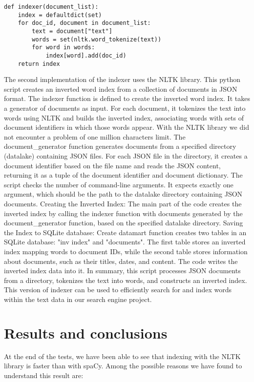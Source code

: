\documentclass{article}
\begin{document}
\begin{verbatim}
def indexer(document_list):
	index = defaultdict(set)
	for doc_id, document in document_list:
		text = document["text"]
		words = set(nltk.word_tokenize(text))
		for word in words:
			index[word].add(doc_id)
	return index
\end{verbatim}

The second implementation of the indexer uses the NLTK library.
This python script creates an inverted word index
from a collection of documents in JSON format.
The indexer function is defined to create the inverted word index.
It takes a generator of documents as input. For each document,
it tokenizes the text into words using NLTK and builds the inverted index,
associating words with sets of document identifiers in which those words appear.
With the NLTK library we did not encounter a problem of one million characters limit.
The document\_generator function generates documents from a specified
directory (datalake) containing JSON files.
For each JSON file in the directory, it creates a document identifier
based on the file name and reads the JSON content,
returning it as a tuple of the document identifier and document dictionary.
The script checks the number of command-line arguments.
It expects exactly one argument, which should be the path to the datalake directory containing JSON documents.
Creating the Inverted Index:
The main part of the code creates the inverted index by
calling the indexer function with documents generated by
the document\_generator function, based on the specified datalake directory.
Saving the Index to SQLite database:
Create datamart function creates two tables in an SQLite database: "inv index" and "documents". 
The first table stores an inverted index mapping words to document IDs, while the second table stores information about documents, such as their titles, dates, and content. The code writes the inverted index data into it.
In summary, this script processes JSON documents from a directory, tokenizes the text into words, and constructs an inverted index. This version of indexer can be used to efficiently search for and index words within the text data in our search engine project.

\section{Results and conclusions}
At the end of the tests, we have been able to see that indexing with the NLTK library is faster
than with spaCy. Among the possible reasons we have found to understand this result are:
\end{document}
